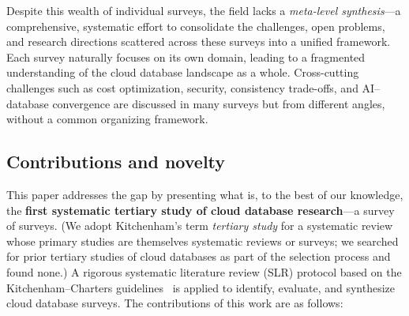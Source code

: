 \documentclass[a4paper,fleqn]{cas-sc}
\begin{document}
Despite this wealth of individual surveys, the field lacks a \emph{meta-level synthesis}---a comprehensive, systematic effort to consolidate the challenges, open problems, and research directions scattered across these surveys into a unified framework. Each survey naturally focuses on its own domain, leading to a fragmented understanding of the cloud database landscape as a whole. Cross-cutting challenges such as cost optimization, security, consistency trade-offs, and AI--database convergence are discussed in many surveys but from different angles, without a common organizing framework.

\subsection{Contributions and novelty}
\label{subsec:contributions}

This paper addresses the gap by presenting what is, to the best of our knowledge, the \textbf{first systematic tertiary study of cloud database research}---a survey of surveys. (We adopt Kitchenham's term \emph{tertiary study} for a systematic review whose primary studies are themselves systematic reviews or surveys; we searched for prior tertiary studies of cloud databases as part of the selection process and found none.) A rigorous systematic literature review (SLR) protocol based on the Kitchenham--Charters guidelines~\cite{Kitchenham2007} is applied to identify, evaluate, and synthesize cloud database surveys. The contributions of this work are as follows:
\end{document}
